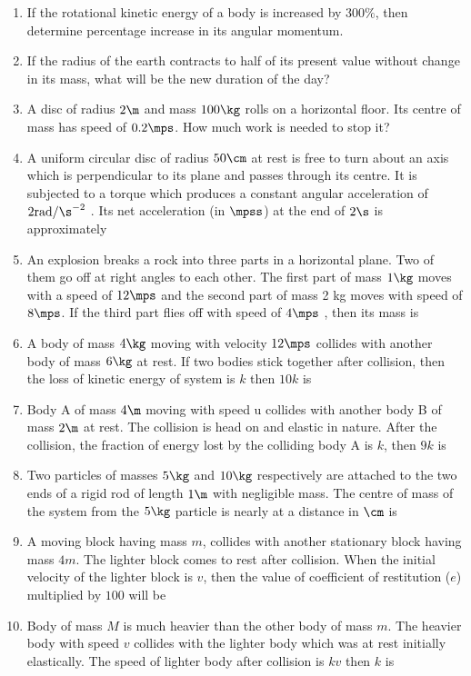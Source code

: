 \documentclass{article}
\begin{document}
\begin{enumerate}\addtocounter{enumi}{20}
\item If the rotational kinetic energy of a body is increased by $300\%$, then determine percentage increase in its angular momentum.

\item If the radius of the earth contracts to half of its present value without change in its mass, what will be the new duration of the day?

\item A disc of radius $2 \m$ and mass $100 \kg$ rolls on a
horizontal floor. Its centre of mass has speed of
$0.2 \mps$. How much work is needed to stop it?

\item A uniform circular disc of radius $50 \cm$ at rest is free to turn about an axis which is perpendicular to its plane and passes through its centre. It is subjected to a torque which produces a constant angular acceleration of $2 \text{rad}/\s^{-2}$ . Its net acceleration (in $\mpss$) at the end of $2 \s$ is approximately

\item An explosion breaks a rock into three parts in a horizontal plane. Two of them go off at right angles to each other. The first part of mass $1 \kg$ moves with a speed of $12 \mps$ and the second part of mass 2 kg
moves with speed of $8 \mps$. If the third part flies off with speed of $4 \mps$ , then its mass is

\item A body of mass $4 \kg$ moving with velocity $12 \mps$ collides with another body of mass $6 \kg$ at rest. If two bodies stick together after collision, then the loss of kinetic energy of system is $k$ then $10k$ is

\item Body A of mass $4\m$ moving with speed u collides
with another body B of mass $2\m$ at rest. The collision
is head on and elastic in nature. After the collision,
the fraction of energy lost by the colliding body A is $k$, then $9k$ is

\item Two particles of masses $5 \kg$ and $10 \kg$ respectively are attached to the two ends of a rigid rod of length $1 \m$ with negligible mass. The centre of mass of the system from the $5 \kg$ particle is nearly at a distance in $\cm$ is

\item A moving block having mass $m$, collides with another stationary block having mass $4m$. The lighter block comes to rest after collision. When the initial velocity of the lighter block is $v$, then the value of coefficient of restitution ($e$) multiplied by $100$ will be


\item Body of mass $M$ is much heavier than the other body
of mass $m$. The heavier body with speed $v$ collides
with the lighter body which was at rest initially
elastically. The speed of lighter body after collision is $kv$ then $k$ is
\end{enumerate}
\end{document}
